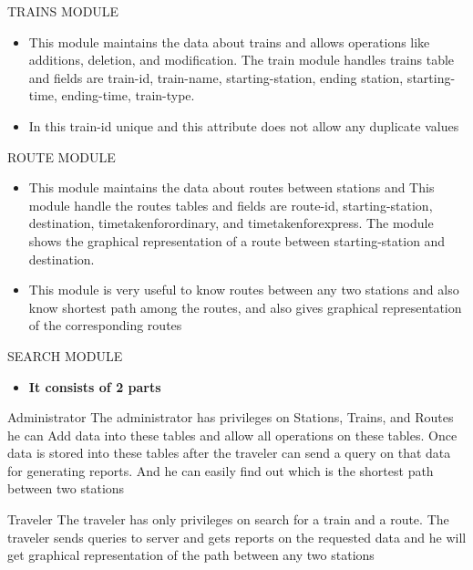 \documentclass[aspectratio=169,xcolor=dvipsnames]{beamer}
\begin{document}

\begin{frame}{TRAINS MODULE}
\begin{itemize}

\item This module maintains the data about trains and allows operations like additions, deletion, and modification. The train module handles trains table and fields are train-id, train-name, starting-station, ending station, starting-time, ending-time, train-type.
\item In this train-id unique and this attribute does not allow any duplicate values

\end{itemize}
\end{frame}


\begin{frame}{ROUTE MODULE}
\begin{itemize}

\item This module maintains the data about routes between stations and This module handle the routes tables and fields are route-id, starting-station, destination, timetakenforordinary, and timetakenforexpress. The module shows the graphical representation of a route between starting-station and destination.
\item This module is very useful to know routes between any two stations and also know shortest path among the routes, and also gives graphical representation of the corresponding routes


\end{itemize}
\end{frame}


\begin{frame}{SEARCH MODULE}
\begin{itemize}
    \item{\textbf{ It consists of 2 parts}}
\end{itemize}

    \begin{block}{Administrator}
        The administrator has privileges on Stations, Trains, and Routes he can Add data into these tables and allow all operations on these tables. Once data is stored into these tables after the traveler can send a query on that data for generating reports. And he can easily find out which is the shortest path between two stations
    \end{block}
    \begin{block}{Traveler}
     The traveler has only privileges on search for a train and a route. The traveler sends queries to server and gets reports on the requested data and he will get graphical representation of the path between any two stations
    \end{block}

\end{frame}
\end{document}
